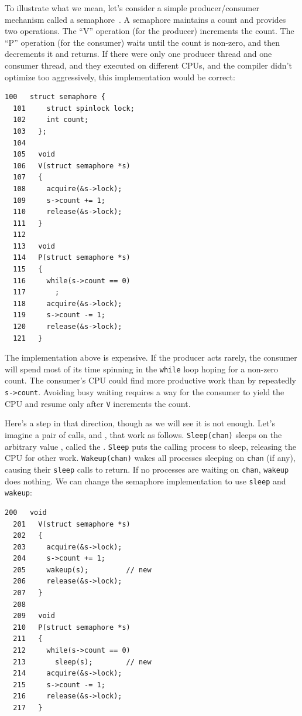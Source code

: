 To illustrate what we mean, let's consider a
simple producer/consumer mechanism called a semaphore~\cite{dijkstra65}.
A semaphore maintains a count and provides two operations.
The ``V'' operation (for the producer) increments the count.
The ``P'' operation (for the consumer) waits until the count is non-zero,
and then decrements it and returns.
If there were only one producer thread and one consumer thread,
and they executed on different CPUs,
and the compiler didn't optimize too aggressively,
this implementation would be correct:
\begin{lstlisting}[]
  100   struct semaphore {
  101     struct spinlock lock;
  102     int count;
  103   };
  104   
  105   void
  106   V(struct semaphore *s)
  107   {
  108     acquire(&s->lock);
  109     s->count += 1;
  110     release(&s->lock);
  111   }
  112   
  113   void
  114   P(struct semaphore *s)
  115   {
  116     while(s->count == 0)
  117       ;
  118     acquire(&s->lock);
  119     s->count -= 1;
  120     release(&s->lock);
  121   }
\end{lstlisting}

The implementation above 
is expensive.  If the producer acts
rarely, the consumer will spend most
of its time spinning in the 
\lstinline{while}
loop hoping for a non-zero count.
The consumer's CPU could find more productive work than
by repeatedly 
\lstinline{s->count}.
Avoiding busy waiting requires
a way for the consumer to yield the CPU
and resume only after
\lstinline{V}
increments the count.

Here's a step in that direction, though as we
will see it is not enough.
Let's imagine a pair of calls, 
and
,
that work as follows.
\lstinline{Sleep(chan)}
sleeps on the arbitrary value
,
called the 
.
\lstinline{Sleep}
puts the calling process to sleep, releasing the CPU
for other work.
\lstinline{Wakeup(chan)}
wakes all processes sleeping on
\lstinline{chan}
(if any), causing their
\lstinline{sleep}
calls to return.
If no processes are waiting on
\lstinline{chan},
\lstinline{wakeup}
does nothing.
We can change the semaphore implementation to use
\lstinline{sleep}
and
\lstinline{wakeup}:
\begin{lstlisting}[]
  200   void
  201   V(struct semaphore *s)
  202   {
  203     acquire(&s->lock);
  204     s->count += 1;
  205     wakeup(s);         // new
  206     release(&s->lock);
  207   }
  208   
  209   void
  210   P(struct semaphore *s)
  211   {
  212     while(s->count == 0)
  213       sleep(s);        // new
  214     acquire(&s->lock);
  215     s->count -= 1;
  216     release(&s->lock);
  217   }
\end{lstlisting}

